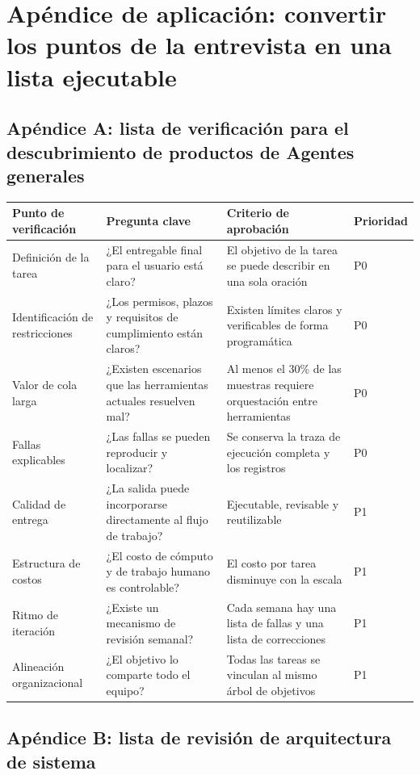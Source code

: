 \section{Apéndice de aplicación: convertir los puntos de la entrevista en una lista ejecutable}

\subsection{Apéndice A: lista de verificación para el descubrimiento de productos de Agentes generales}

\begin{center}
\begin{tabular}{p{3.1cm}p{3.4cm}p{5.8cm}p{2.2cm}}
\toprule
Punto de verificación & Pregunta clave & Criterio de aprobación & Prioridad \\
\midrule
Definición de la tarea & ¿El entregable final para el usuario está claro? & El objetivo de la tarea se puede describir en una sola oración & P0 \\
Identificación de restricciones & ¿Los permisos, plazos y requisitos de cumplimiento están claros? & Existen límites claros y verificables de forma programática & P0 \\
Valor de cola larga & ¿Existen escenarios que las herramientas actuales resuelven mal? & Al menos el 30\% de las muestras requiere orquestación entre herramientas & P0 \\
Fallas explicables & ¿Las fallas se pueden reproducir y localizar? & Se conserva la traza de ejecución completa y los registros & P0 \\
Calidad de entrega & ¿La salida puede incorporarse directamente al flujo de trabajo? & Ejecutable, revisable y reutilizable & P1 \\
Estructura de costos & ¿El costo de cómputo y de trabajo humano es controlable? & El costo por tarea disminuye con la escala & P1 \\
Ritmo de iteración & ¿Existe un mecanismo de revisión semanal? & Cada semana hay una lista de fallas y una lista de correcciones & P1 \\
Alineación organizacional & ¿El objetivo lo comparte todo el equipo? & Todas las tareas se vinculan al mismo árbol de objetivos & P1 \\
\bottomrule
\end{tabular}
\end{center}

\subsection{Apéndice B: lista de revisión de arquitectura de sistema}

